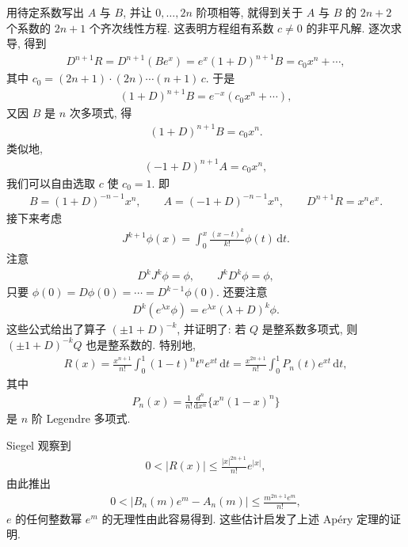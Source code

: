 用待定系数写出 $A$ 与 $B$, 并让 $0, \ldots, 2n$ 阶项相等, 就得到关于 $A$ 与 $B$ 的 $2n+2$ 个系数的 $2n+1$ 个齐次线性方程. 这表明方程组有系数 $c \neq 0$ 的非平凡解. 逐次求导, 得到
\begin{align*}
  D^{n+1}R=D^{n+1}(Be^{x})=e^{x}(1+D)^{n+1}B=c_{0}x^{n}+\cdots,
\end{align*}
其中 $c_{0} = (2n + 1)\cdot(2n)\cdots(n + 1)\,c$. 于是
\begin{align*}
  (1+D)^{n+1}B=e^{-x}\left(c_{0}x^{n}+\cdots\right),
\end{align*}
又因 $B$ 是 $n$ 次多项式, 得
\begin{align*}
  (1+D)^{n+1}B=c_{0}x^{n}.
\end{align*}
类似地,
\begin{align*}
  (-1+D)^{n+1}A=c_{0}x^{n},
\end{align*}
我们可以自由选取 $c$ 使 $c_{0}=1$. 即
\begin{align*}
  B=\left(1+D\right)^{-n-1}x^{n},\qquad
  A=\left(-1+D\right)^{-n-1}x^{n},\qquad
  D^{n+1}R=x^{n}e^{x}.
\end{align*}
接下来考虑
\begin{align*}
  J^{k+1}\phi(x)=\int_{0}^{x}\frac{(x-t)^{k}}{k!}\phi(t)\,\mathrm{d}t.
\end{align*}
注意
\begin{align*}
  D^{k}J^{k}\phi=\phi,\qquad J^{k}D^{k}\phi=\phi,
\end{align*}
只要 $\phi(0) = D\phi(0) = \cdots = D^{k-1}\phi(0)$. 还要注意
\begin{align*}
  D^{k}(e^{\lambda x}\phi)=e^{\lambda x}(\lambda+D)^{k}\phi.
\end{align*}
这些公式给出了算子 $(\pm1+D)^{-k}$, 并证明了: 若 $Q$ 是整系数多项式, 则 $(\pm1+D)^{-k}Q$ 也是整系数的. 特别地,
\begin{align*}
  R(x)=\frac{x^{n+1}}{n!}\int_{0}^{1}(1-t)^{n}t^{n}e^{x t}\,\mathrm{d}t
  =\frac{x^{2n+1}}{n!}\int_{0}^{1}P_{n}(t)e^{x t}\,\mathrm{d}t,
\end{align*}
其中
\begin{align*}
  P_{n}(x)=\frac{1}{n!}\frac{d^{n}}{\mathrm{d}x^{n}}\{x^{n}(1-x)^{n}\}
\end{align*}
是 $n$ 阶 Legendre 多项式.

Siegel 观察到
\begin{align*}
  0<|R(x)|\leq\frac{|x|^{2n+1}}{n!}e^{|x|},
\end{align*}
由此推出
\begin{align*}
  0<|B_{n}(m)e^{m}-A_{n}(m)|\leq\frac{m^{2n+1}e^{m}}{n!},
\end{align*}
$e$ 的任何整数幂 $e^m$ 的无理性由此容易得到. 这些估计启发了上述 Apéry 定理的证明.

